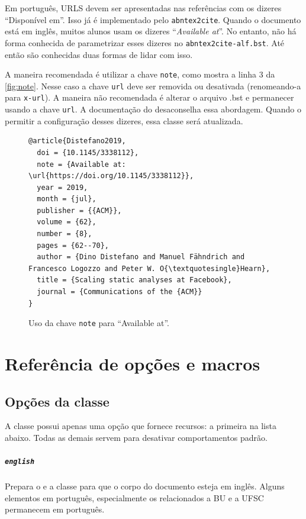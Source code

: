 \documentclass[embeddedlogo]{../ufsc-thesis-rn46-2019}
\begin{document}
Em português, URLS devem ser apresentadas nas referências com os dizeres
``Disponível em''. Isso já é implementado pelo \texttt{abntex2cite}. Quando o
documento está em inglês, muitos alunos usam os dizeres ``\textit{Available
  at}''. No entanto, não há forma conhecida de parametrizar esses dizeres no
\texttt{abntex2cite-alf.bst}. Até então são conhecidas duas formas de lidar com
isso.

A maneira recomendada é utilizar a chave \texttt{note}, como mostra a linha 3 da
\autoref{fig:note}. Nesse caso a chave \texttt{url} deve ser removida ou
desativada (renomeando-a para \texttt{x-url}). A maneira não recomendada é
alterar o arquivo .bst e permanecer usando a chave \texttt{url}. A documentação
do \abnTeX desaconselha essa abordagem. Quando o \abnTeX permitir a configuração
desses dizeres, essa classe será atualizada.

\begin{figure}[tb]
  \centering
  \caption{Uso da chave \texttt{note} para ``Available at''.}
  \label{fig:note}
\begin{verbatim}
@article{Distefano2019,
  doi = {10.1145/3338112},
  note = {Available at: \url{https://doi.org/10.1145/3338112}},
  year = 2019,
  month = {jul},
  publisher = {{ACM}},
  volume = {62},
  number = {8},
  pages = {62--70},
  author = {Dino Distefano and Manuel Fähndrich and Francesco Logozzo and Peter W. O{\textquotesingle}Hearn},
  title = {Scaling static analyses at Facebook},
  journal = {Communications of the {ACM}}
}
\end{verbatim}
\end{figure}

\chapter{Referência de opções e macros}
\label{ch:ref}

\section{Opções da classe}

A classe possui apenas uma opção que fornece recursos: a primeira na lista
abaixo. Todas as demais servem para desativar comportamentos padrão.

\paragraph*{\texttt{english}} Prepara o \abnTeX{} e a classe para que o corpo
do documento esteja em inglês. Alguns elementos em português, especialmente os
relacionados a BU e a UFSC permanecem em português.
\end{document}
